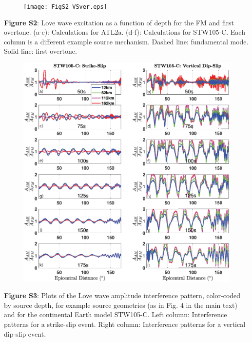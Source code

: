 \documentclass[extra,mreferee]{gji}
\begin{document}
\newpage
\begin{figure}
 \noindent\texttt{[image: FigS2\_VSver.eps]} \end{figure} 
\textbf{Figure S2}: Love wave excitation as a function of depth for the FM and first overtone. (a-c): Calculations for ATL2a. (d-f): Calculations for STW105-C. Each column is a different example source mechanism. Dashed line: fundamental mode. Solid line: first overtone.


\newpage
\begin{figure}
 \noindent\includegraphics[width=1\textwidth]{FigS3_VSver.eps}
\end{figure}
\textbf{Figure S3}: Plots of the Love wave amplitude interference pattern, color-coded by source depth, for example source geometries (as in Fig. 4 in the main text) and for the continental Earth model STW105-C. Left column: Interference patterns for a strike-slip event. Right column: Interference patterns for a vertical dip-slip event.  
\end{document}
